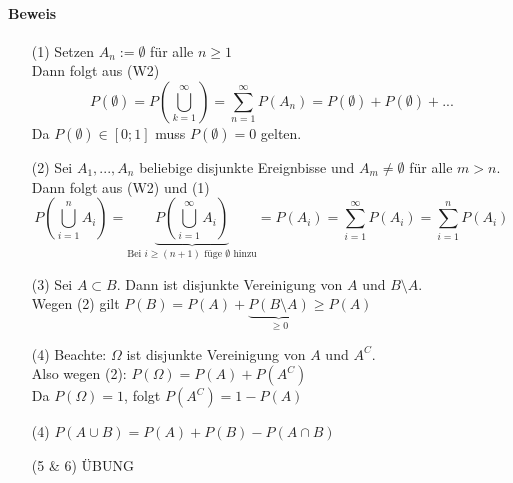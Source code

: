 \documentclass[10pt,a4paper,titlepage]{book}
\begin{document}
\paragraph{Beweis}
\begin{itemize}
\item[(1)]Setzen $A_n := \emptyset$ für alle $n \geq 1$\\
Dann folgt aus (W2)
$$P(\emptyset) = P\left(\bigcup_{k=1}^\infty \right) = \sum_{n=1}^\infty P(A_n) = P(\emptyset) + P(\emptyset) + ...$$
Da $P(\emptyset) \in [0;1]$ muss $P(\emptyset) = 0$ gelten.
\item[(2)] Sei $A_1, ..., A_n$ beliebige disjunkte Ereignbisse und $A_m \neq \emptyset$ für alle $m > n$. Dann folgt aus (W2) und (1)
$$P\left(\bigcup_{i=1}^n  A_i\right) = \underbrace{ P\left(\bigcup_{i=1}^\infty  A_i\right)}_{\text{Bei } i \geq (n+1) \text{ füge } \emptyset \text{ hinzu}} = P(A_i) = \sum_{i=1}^\infty P(A_i) = \sum_{i=1}^n P(A_i)$$

\item[(3)] Sei $A \subset B$. Dann ist disjunkte Vereinigung von $A$ und $B \setminus A$. 
\\Wegen (2) gilt $P(B) = P(A) + \underbrace{P(B \setminus A)}_{\geq 0} \geq P(A)$

\item[(4)] Beachte: $\Omega$ ist disjunkte Vereinigung von $A$ und $A^C$.\\
Also wegen (2):
$P(\Omega) = P(A) + P(A^C)$\\
Da $P(\Omega) = 1$, folgt $P(A^C) = 1-P(A)$

\item[(4)] $P(A \cup B) = P(A) + P(B) - P(A \cap B)$
\item[(5 \& 6)] ÜBUNG

\end{itemize}

\end{document}
